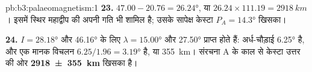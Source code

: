 \begin{solution}{pb:b3:palaeomagnetism:1}
\textbf{23.} $47.00 - 20.76 = \ang{26.24}$, या $26.24\times111.19 =
\qty{2918}{km}$। इसमें स्थिर महाद्वीप की अपनी गति भी शामिल है;
उसके सापेक्ष केस्टा $P_A = \ang{14.3}$ खिसका।

\textbf{24.} $I = \ang{28.18}$ और \ang{46.16} के लिए $\lambda = \ang{15.00}$ और
\ang{27.50} प्राप्त होते हैं: अर्ध-चौड़ाई \ang{6.25} है, और एक मानक विचलन
$6.25/1.96 = \ang{3.19}$ है, या \qty{355}{km}। संरचना A के काल से केस्टा
उत्तर की ओर
\textbf{\qty[text-series-to-math=true]{2918 \pm 355}{km}} खिसका है।
\end{solution}
